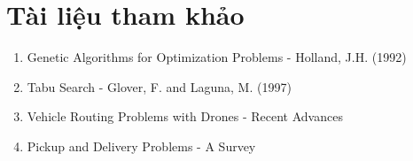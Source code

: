 \documentclass[12pt,a4paper]{article}
\begin{document}
\section*{Tài liệu tham khảo}

\begin{enumerate}
    \item Genetic Algorithms for Optimization Problems - Holland, J.H. (1992)
    \item Tabu Search - Glover, F. and Laguna, M. (1997)
    \item Vehicle Routing Problems with Drones - Recent Advances
    \item Pickup and Delivery Problems - A Survey
\end{enumerate}
\end{document}
